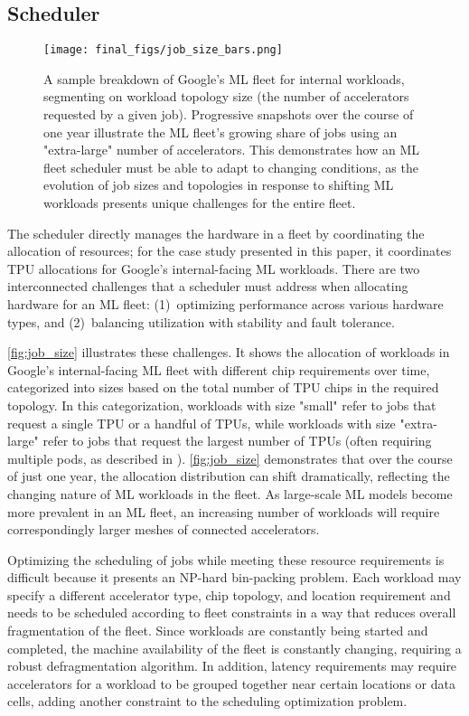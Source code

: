 \subsection{Scheduler}\label{sec:scheduler}
\begin{figure}[t!]
    \centering
    \texttt{[image: final\_figs/job\_size\_bars.png]}
    \caption{A sample breakdown of Google's ML fleet for internal workloads, segmenting on workload topology size (the number of accelerators requested by a given job). Progressive snapshots over the course of one year illustrate the ML fleet's growing share of jobs using an "extra-large" number of accelerators. This demonstrates how an ML fleet scheduler must be able to adapt to changing conditions, as the evolution of job sizes and topologies in response to shifting ML workloads presents unique challenges for the entire fleet.}
    \label{fig:job_size}
\end{figure}
The scheduler directly manages the hardware in a fleet by coordinating the allocation of resources; for the case study presented in this paper, it coordinates TPU allocations for Google's internal-facing ML workloads. There are two interconnected challenges that a scheduler must address when allocating hardware for an ML fleet: (1)~optimizing performance across various hardware types, and (2)~balancing utilization with stability and fault tolerance.

\autoref{fig:job_size} illustrates these challenges. It shows the allocation of workloads in Google's internal-facing ML fleet with different chip requirements over time, categorized into sizes based on the total number of TPU chips in the required topology. In this categorization, workloads with size "small" refer to jobs that request a single TPU or a handful of TPUs, while workloads with size "extra-large" refer to jobs that request the largest number of TPUs (often requiring multiple pods, as described in \citet{kumar2021exploring}). \autoref{fig:job_size} demonstrates that over the course of just one year, the allocation distribution can shift dramatically, reflecting the changing nature of ML workloads in the fleet. As large-scale ML models become more prevalent in an ML fleet, an increasing number of workloads will require correspondingly larger meshes of connected accelerators.







Optimizing the scheduling of jobs while meeting these resource requirements is difficult because it presents an NP-hard bin-packing problem. Each workload may specify a different accelerator type, chip topology, and location requirement and needs to be scheduled according to fleet constraints in a way that reduces overall fragmentation of the fleet. Since workloads are constantly being started and completed, the machine availability of the fleet is constantly changing, requiring a robust defragmentation algorithm. In addition, latency requirements may require accelerators for a workload to be grouped together near certain locations or data cells, adding another constraint to the scheduling optimization problem. 

